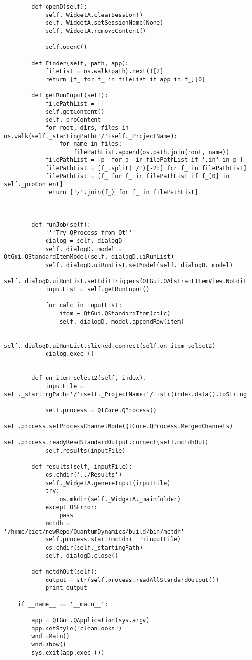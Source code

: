 \begin{verbatim}
        def openD(self):
            self._WidgetA.clearSession()
            self._WidgetA.setSessionName(None)
            self._WidgetA.removeContent()
    
            self.openC()
    
        def Finder(self, path, app):
            fileList = os.walk(path).next()[2]
            return [f_ for f_ in fileList if app in f_][0]
    
        def getRunInput(self):
            filePathList = []
            self.getContent()
            self._proContent
            for root, dirs, files in os.walk(self._startingPath+'/'+self._ProjectName):
                for name in files:
                    filePathList.append(os.path.join(root, name))
            filePathList = [p_ for p_ in filePathList if '.in' in p_]
            filePathList = [f_.split('/')[-2:] for f_ in filePathList]
            filePathList = [f_ for f_ in filePathList if f_[0] in self._proContent]
            return ['/'.join(f_) for f_ in filePathList]
    
        
    
        def runJob(self):
            '''Try QProcess from Qt'''
            dialog = self._dialogD
            self._dialogD._model = QtGui.QStandardItemModel(self._dialogD.uiRunList)
            self._dialogD.uiRunList.setModel(self._dialogD._model)
            self._dialogD.uiRunList.setEditTriggers(QtGui.QAbstractItemView.NoEditTriggers)
            inputList = self.getRunInput()
    
            for calc in inputList:
                item = QtGui.QStandardItem(calc)
                self._dialogD._model.appendRow(item)
    
            self._dialogD.uiRunList.clicked.connect(self.on_item_select2)
            dialog.exec_()
            
    
        def on_item_select2(self, index):
            inputFile = self._startingPath+'/'+self._ProjectName+'/'+str(index.data().toString())
    
            self.process = QtCore.QProcess()
            self.process.setProcessChannelMode(QtCore.QProcess.MergedChannels)
            self.process.readyReadStandardOutput.connect(self.mctdhOut)
            self.results(inputFile)
    
        def results(self, inputFile):
            os.chdir('../Results')
            self._WidgetA.genereInput(inputFile)
            try:
                os.mkdir(self._WidgetA._mainfolder)
            except OSError:
                pass
            mctdh = '/home/piet/newRepo/QuantumDynamics/build/bin/mctdh'
            self.process.start(mctdh+' '+inputFile)
            os.chdir(self._startingPath)
            self._dialogD.close()
    
        def mctdhOut(self):
            output = str(self.process.readAllStandardOutput())
            print output
    
    if __name__ == '__main__':
    
        app = QtGui.QApplication(sys.argv)
        app.setStyle("cleanlooks")
        wnd =Main()
        wnd.show()
        sys.exit(app.exec_())
\end{verbatim}

